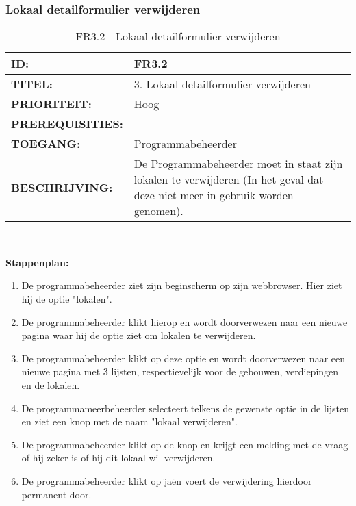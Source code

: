 \subsubsection{Lokaal detailformulier verwijderen}        
\noindent\begin{table}[H]
            \begin{tabular}{l | p{10cm}}
                \textbf{ID:} & FR3.2 \\ \hline
                \textbf{TITEL:} & 3. Lokaal detailformulier verwijderen\\ \hline
                \textbf{PRIORITEIT:} &  Hoog \\ \hline
                \textbf{PREREQUISITIES:} & \\ \hline
                \textbf{TOEGANG:} & Programmabeheerder \\ \hline
                \textbf{BESCHRIJVING:} & De Programmabeheerder moet in staat zijn lokalen te verwijderen (In het geval dat deze niet meer in gebruik worden genomen).\\ 
            \end{tabular}\\
            \caption{FR3.2 - Lokaal detailformulier verwijderen}
            \label{tab:FR3.2- Lokaal detailformulier verwijderen}
        \end{table}
        
\textbf{Stappenplan:}       
\begin{enumerate}
\item De programmabeheerder ziet zijn beginscherm op zijn webbrowser. Hier ziet hij de optie "lokalen".
\item De programmabeheerder klikt hierop en wordt doorverwezen naar een nieuwe pagina waar hij de optie ziet om lokalen te verwijderen.
\item De programmabeheerder klikt op deze optie en wordt doorverwezen naar een nieuwe pagina met 3 lijsten, respectievelijk voor de gebouwen, verdiepingen en de lokalen.
\item De programmameerbeheerder selecteert telkens de gewenste optie in de lijsten en ziet een knop met de naam "lokaal verwijderen".
\item De programmabeheerder klikt op de knop en krijgt een melding met de vraag of hij zeker is of hij dit lokaal wil verwijderen.
\item De programmabeheerder klikt op \"ja\" en voert de verwijdering hierdoor permanent door.
\end{enumerate}      

